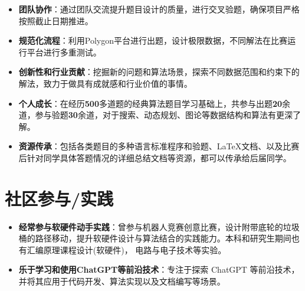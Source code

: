 \documentclass{resume}
\begin{document}
\begin{itemize}
	\item \textbf{团队协作}：通过团队交流提升题目设计的质量，进行交叉验题，确保项目严格按照截止日期推进。
	\item \textbf{规范化流程}：利用Polygon平台进行出题，设计极限数据，不同解法在比赛运行平台进行多重测试。
	\item \textbf{创新性和行业贡献}：挖掘新的问题和算法场景，探索不同数据范围和约束下的解法，致力于做具有成就感和行业价值的事情。
	\item \textbf{个人成长}：在经历\textbf{500}多道题的经典算法题目学习基础上，共参与出题\textbf{20}余道，参与验题\textbf{30}余道，对于搜索、动态规划、图论等数据结构和算法有更深了解。
	\item \textbf{资源传承}：包括各类题目的多种语言标准程序和验题、LaTeX文档、以及比赛后针对同学具体答题情况的详细总结文档等资源，都可以传承给后届同学。
\end{itemize}



\section{社区参与/实践}
\begin{itemize}[parsep=0.2ex]  
  \item \textbf{经常参与软硬件动手实践}：曾参与机器人竞赛创意比赛，设计附带底轮的垃圾桶的路径移动，提升软硬件设计与算法结合的实践能力。本科和研究生期间也有汇编原理课程设计(软硬件)， 电路与电子技术等实验。
  \item \textbf{乐于学习和使用ChatGPT等前沿技术}：专注于探索 ChatGPT 等前沿技术，并将其应用于代码开发、算法实现以及文档编写等场景。
  
\end{itemize}

%
%
\end{document}
